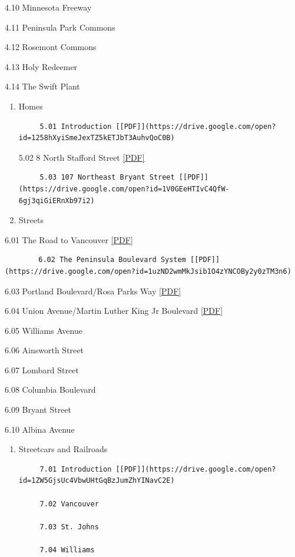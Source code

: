 \documentclass[
  12pt,
]{book}
\begin{document}
4.10 Minnesota Freeway

4.11 Peninsula Park Commons

4.12 Rosemont Commons

4.13 Holy Redeemer

4.14 The Swift Plant

\begin{enumerate}
\def\labelenumi{\arabic{enumi}.}
\setcounter{enumi}{4}
\item
  Homes

\begin{verbatim}
     5.01 Introduction [[PDF]](https://drive.google.com/open?id=1258hXyiSmeJexTZ5kETJbT3AuhvQoC0B)
\end{verbatim}

  5.02 8 North Stafford Street \href{https://drive.google.com/open?id=1njP7hB8vLeHYKtBuj5woXO30exj63RsC}{{[}PDF{]}}

\begin{verbatim}
     5.03 107 Northeast Bryant Street [[PDF]](https://drive.google.com/open?id=1V0GEeHTIvC4QfW-6gj3qiGiERnXb97i2)
\end{verbatim}
\item
  Streets
\end{enumerate}

6.01 The Road to Vancouver \href{https://drive.google.com/open?id=1cRbmNIRf3RuNY-YTFR6RlJn9syr2wQ7I}{{[}PDF{]}}

\begin{verbatim}
        6.02 The Peninsula Boulevard System [[PDF]](https://drive.google.com/open?id=1uzND2wmMkJsib1O4zYNCOBy2y0zTM3n6)
\end{verbatim}

6.03 Portland Boulevard/Rosa Parks Way \href{https://drive.google.com/open?id=1C1D7t9tRfvBke_81-sVMeE-cfmPuh3gG}{{[}PDF{]}}

6.04 Union Avenue/Martin Luther King Jr Boulevard \href{https://drive.google.com/open?id=14O557QNs9NU-0t7JLnDv3JiS37QhmOze}{{[}PDF{]}}

6.05 Williams Avenue

6.06 Ainsworth Street

6.07 Lombard Street

6.08 Columbia Boulevard

6.09 Bryant Street

6.10 Albina Avenue

\begin{enumerate}
\def\labelenumi{\arabic{enumi}.}
\setcounter{enumi}{6}
\item
  Streetcars and Railroads

\begin{verbatim}
     7.01 Introduction [[PDF]](https://drive.google.com/open?id=1ZW5GjsUc4VbwUHtGqBzJumZhYINavC2E)

     7.02 Vancouver

     7.03 St. Johns

     7.04 Williams
\end{verbatim}
\end{enumerate}
\end{document}

